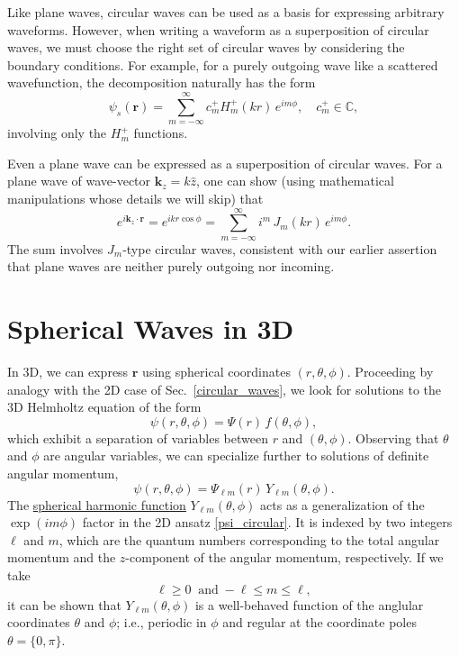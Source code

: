 \documentclass[prx,12pt]{revtex4-2}
\begin{document}
Like plane waves, circular waves can be used as a basis for expressing
arbitrary waveforms.  However, when writing a waveform as a
superposition of circular waves, we must choose the right set of
circular waves by considering the boundary conditions.  For example,
for a purely outgoing wave like a scattered wavefunction, the
decomposition naturally has the form
\begin{equation}
  \psi_s(\mathbf{r}) = \sum_{m=-\infty}^\infty c_m^+ H_m^+(kr) \, e^{im\phi},
  \quad c_m^+ \in \mathbb{C},
\end{equation}
involving only the $H_m^+$ functions.

Even a plane wave can be expressed as a superposition of circular
waves.  For a plane wave of wave-vector $\mathbf{k}_z = k \hat{z}$,
one can show (using mathematical manipulations whose details we will
skip) that
\begin{equation}
  e^{i\mathbf{k}_z \cdot \mathbf{r}} =
  e^{ikr\cos\phi} = \sum_{m=-\infty}^\infty i^m \, J_m(kr)\, e^{im\phi}.
  \label{eikrcosphi}
\end{equation}
The sum involves $J_m$-type circular waves, consistent with our
earlier assertion that plane waves are neither purely outgoing nor
incoming.

\section{Spherical Waves in 3D}
\label{sec:spherical}

In 3D, we can express $\mathbf{r}$ using spherical coordinates $(r,
\theta, \phi)$.  Proceeding by analogy with the 2D case of
Sec.~\ref{circular_waves}, we look for solutions to the 3D Helmholtz
equation of the form
\begin{equation}
  \psi(r,\theta,\phi) = \Psi(r) \, f(\theta, \phi),
  \label{psi3d0}
\end{equation}
which exhibit a separation of variables between $r$ and
$(\theta,\phi)$.  Observing that $\theta$ and $\phi$ are angular
variables, we can specialize further to solutions of definite angular
momentum,
\begin{equation}
  \psi(r,\theta,\phi) = \Psi_{\ell m}(r) \,Y_{\ell m}(\theta, \phi).
  \label{psi3d}
\end{equation}
The
\href{https://docs.scipy.org/doc/scipy/reference/generated/scipy.special.sph_harm.html}{spherical
  harmonic function} $Y_{\ell m}(\theta,\phi)$ acts as a
generalization of the $\exp(im\phi)$ factor in the 2D ansatz
\eqref{psi_circular}.  It is indexed by two integers $\ell$ and $m$,
which are the quantum numbers corresponding to the total angular
momentum and the $z$-component of the angular momentum, respectively.
If we take
\begin{equation}
  \ell \ge 0 \;\;\mathrm{and}\; -\ell\le m \le \ell,
  \label{ellm}
\end{equation}
it can be shown that $Y_{\ell m}(\theta,\phi)$ is a well-behaved
function of the anglular coordinates $\theta$ and $\phi$; i.e.,
periodic in $\phi$ and regular at the coordinate poles $\theta = \{0,
\pi\}$.
\end{document}
